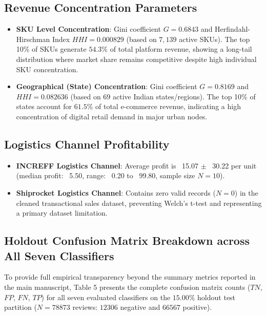 \documentclass[11pt]{article}
\begin{document}
\subsection{Revenue Concentration Parameters}
\begin{itemize}
    \item \textbf{SKU Level Concentration}: Gini coefficient $G = 0.6843$ and Herfindahl-Hirschman Index $HHI = 0.000829$ (based on $7,139$ active SKUs). The top 10\% of SKUs generate $54.3\%$ of total platform revenue, showing a long-tail distribution where market share remains competitive despite high individual SKU concentration.
    \item \textbf{Geographical (State) Concentration}: Gini coefficient $G = 0.8169$ and $HHI = 0.082636$ (based on $69$ active Indian states/regions). The top 10\% of states account for $61.5\%$ of total e-commerce revenue, indicating a high concentration of digital retail demand in major urban nodes.
\end{itemize}

\subsection{Logistics Channel Profitability}
\begin{itemize}
    \item \textbf{INCREFF Logistics Channel}: Average profit is \rupee~15.07 $\pm$ \rupee~30.22 per unit (median profit: \rupee~5.50, range: \rupee~0.20 to \rupee~99.80, sample size $N = 10$).
    \item \textbf{Shiprocket Logistics Channel}: Contains zero valid records ($N = 0$) in the cleaned transactional sales dataset, preventing Welch's t-test and representing a primary dataset limitation.
\end{itemize}

\subsection{Holdout Confusion Matrix Breakdown across All Seven Classifiers}
To provide full empirical transparency beyond the summary metrics reported in the main manuscript, Table 5 presents the complete confusion matrix counts ($TN$, $FP$, $FN$, $TP$) for all seven evaluated classifiers on the $15.00\%$ holdout test partition ($N = 78873$ reviews: $12306$ negative and $66567$ positive).
\end{document}
